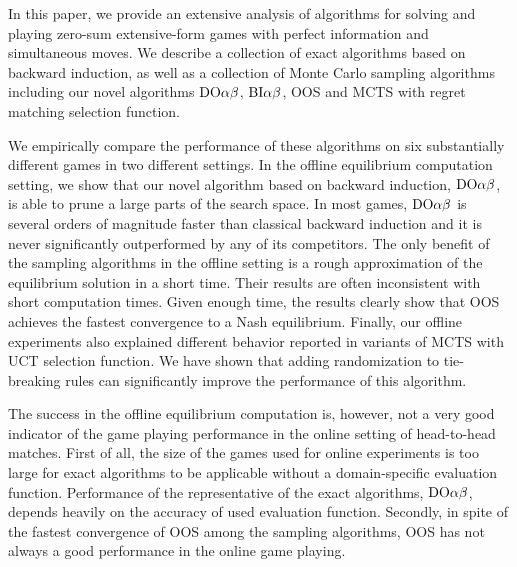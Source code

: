 
In this paper, we provide an extensive analysis of algorithms for solving and playing zero-sum extensive-form games with perfect information and simultaneous moves. We describe a collection of exact algorithms based on backward induction, as well as a collection of Monte Carlo sampling algorithms including our novel algorithms $\textrm{DO}\alpha\beta$, $\textrm{BI}\alpha\beta$, OOS and MCTS with regret matching selection function. 

We empirically compare the performance of these algorithms on six substantially different games in two different settings. In the offline equilibrium computation setting, we show that our novel algorithm based on backward induction, $\textrm{DO}\alpha\beta$, is able to prune a large parts of the search space. In most games, $\textrm{DO}\alpha\beta$ is several orders of magnitude faster than classical backward induction and it is never significantly outperformed by any of its competitors. The only benefit of the sampling algorithms in the offline setting is a rough approximation of the equilibrium solution in a short time. Their results are often inconsistent with short computation times. Given enough time, the results clearly show that OOS achieves the fastest convergence to a Nash equilibrium. Finally, our offline experiments also explained different behavior reported in variants of MCTS with UCT selection function. We have shown that adding randomization to tie-breaking rules can significantly improve the performance of this algorithm.

The success in the offline equilibrium computation is, however, not a very good indicator of the game playing performance in the online setting of head-to-head matches. First of all, the size of the games used for online experiments is too large for exact algorithms to be applicable without a domain-specific evaluation function. Performance of the representative of the exact algorithms, $\textrm{DO}\alpha\beta$, depends heavily on the accuracy of used evaluation function. Secondly, in spite of the fastest convergence of OOS among the sampling algorithms, OOS has not always a good performance in the online game playing. 



